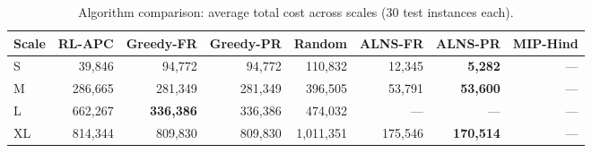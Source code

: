 \begin{table}[htbp]
\centering
\caption{Algorithm comparison: average total cost across scales (30 test instances each).}
\label{tab:comparison}
\begin{tabular}{lrrrrrrr}
\toprule
Scale & RL-APC & Greedy-FR & Greedy-PR & Random & ALNS-FR & ALNS-PR & MIP-Hind \\
\midrule
S & 39,846 & 94,772 & 94,772 & 110,832 & 12,345 & \textbf{5,282} & — \\
M & 286,665 & 281,349 & 281,349 & 396,505 & 53,791 & \textbf{53,600} & — \\
L & 662,267 & \textbf{336,386} & 336,386 & 474,032 & — & — & — \\
XL & 814,344 & 809,830 & 809,830 & 1,011,351 & 175,546 & \textbf{170,514} & — \\
\bottomrule
\end{tabular}
\end{table}
